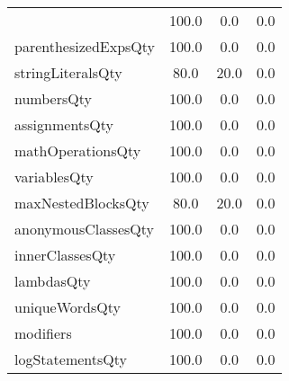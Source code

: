 \begin{tabular}{lccc}
{tryCatchQty & 100.0 & 0.0 & 0.0 \\
parenthesizedExpsQty & 100.0 & 0.0 & 0.0 \\
stringLiteralsQty & 80.0 & 20.0 & 0.0 \\
numbersQty & 100.0 & 0.0 & 0.0 \\
assignmentsQty & 100.0 & 0.0 & 0.0 \\
mathOperationsQty & 100.0 & 0.0 & 0.0 \\
variablesQty & 100.0 & 0.0 & 0.0 \\
maxNestedBlocksQty & 80.0 & 20.0 & 0.0 \\
anonymousClassesQty & 100.0 & 0.0 & 0.0 \\
innerClassesQty & 100.0 & 0.0 & 0.0 \\
lambdasQty & 100.0 & 0.0 & 0.0 \\
uniqueWordsQty & 100.0 & 0.0 & 0.0 \\
modifiers & 100.0 & 0.0 & 0.0 \\
logStatementsQty & 100.0 & 0.0 & 0.0 \\
\bottomrule
              \end{tabular}
            